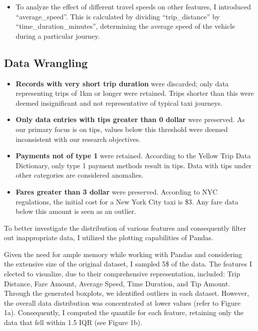 \documentclass[11pt]{article}
\begin{document}
\begin{itemize} 
    \item To analyze the effect of different travel speeds on other features, I introduced “average\_speed”. This is calculated by dividing “trip\_distance” by “time\_duration\_minutes”, determining the average speed of the vehicle during a particular journey.
\end{itemize}

\subsection{Data Wrangling}
\begin{itemize} 
    \item \textbf{Records with very short trip duration} were discarded; only data representing trips of 1km or longer were retained. Trips shorter than this were deemed insignificant and not representative of typical taxi journeys.
\end{itemize}

\begin{itemize} 
    \item \textbf{Only data entries with tips greater than 0 dollar} were preserved. As our primary focus is on tips, values below this threshold were deemed inconsistent with our research objectives.
\end{itemize}

\begin{itemize} 
    \item \textbf{Payments not of type 1} were retained. According to the Yellow Trip Data Dictionary, only type 1 payment methods result in tips. Data with tips under other categories are considered anomalies.
\end{itemize}

\begin{itemize} 
    \item \textbf{Fares greater than 3 dollar} were preserved. According to NYC regulations, the initial cost for a New York City taxi is \$3. Any fare data below this amount is seen as an outlier.
\end{itemize}


To better investigate the distribution of various features and consequently filter out inappropriate data, I utilized the plotting capabilities of Pandas.

Given the need for ample memory while working with Pandas and considering the extensive size of the original dataset, I sampled 5\$ of the data. The features I elected to visualize, due to their comprehensive representation, included: Trip Distance, Fare Amount, Average Speed, Time Duration, and Tip Amount. Through the generated boxplots, we identified outliers in each dataset. However, the overall data distribution was concentrated at lower values (refer to Figure 1a). Consequently, I computed the quantile for each feature, retaining only the data that fell within 1.5 IQR (see Figure 1b).
\end{document}
